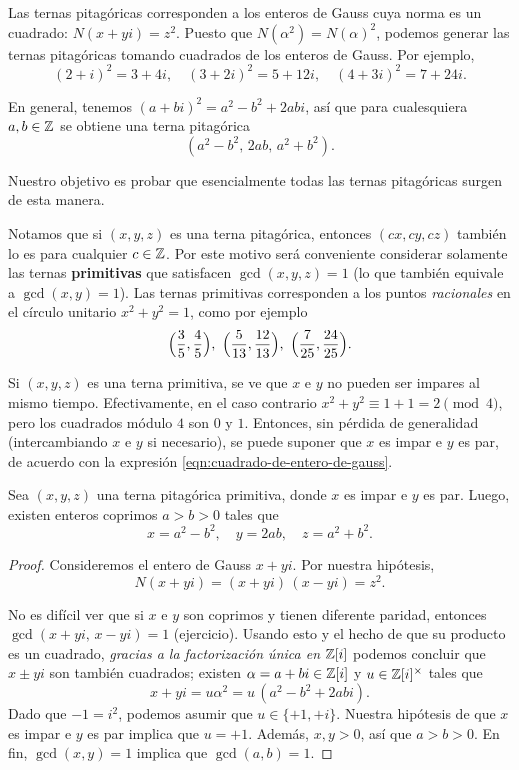 Las ternas pitagóricas corresponden a los enteros de Gauss cuya norma es un
cuadrado: $N (x+yi) = z^2$. Puesto que $N (\alpha^2) = N (\alpha)^2$, podemos
generar las ternas pitagóricas tomando cuadrados de los enteros de Gauss.
Por ejemplo,
\[ (2 + i)^2 = 3 + 4i, \quad
   (3 + 2i)^2 = 5 + 12i, \quad
   (4 + 3i)^2 = 7 + 24i. \]

En general, tenemos $(a + bi)^2 = a^2 - b^2 + 2ab i$, así que para cualesquiera
$a,b \in \mathbb{Z}$ se obtiene una terna pitagórica
\begin{equation}
  \label{eqn:cuadrado-de-entero-de-gauss}
  (a^2 - b^2, \, 2ab, \, a^2 + b^2).
\end{equation}

Nuestro objetivo es probar que esencialmente todas las ternas pitagóricas surgen
de esta manera.

Notamos que si $(x,y,z)$ es una terna pitagórica, entonces $(cx, cy, cz)$
también lo es para cualquier $c \in \mathbb{Z}$. Por este motivo será conveniente
considerar solamente las ternas \textbf{primitivas} que satisfacen
$\gcd (x,y,z) = 1$ (lo que también equivale a $\gcd (x,y) = 1$). Las ternas
primitivas corresponden a los puntos \emph{racionales} en el círculo unitario
$x^2 + y^2 = 1$, como por ejemplo
\[ \Bigl(\frac{3}{5}, \frac{4}{5}\Bigr), ~
   \Bigl(\frac{5}{13}, \frac{12}{13}\Bigr), ~
   \Bigl(\frac{7}{25}, \frac{24}{25}\Bigr). \]

Si $(x,y,z)$ es una terna primitiva, se ve que $x$ e $y$ no pueden ser impares
al mismo tiempo. Efectivamente, en el caso contrario $x^2 + y^2 \equiv 1 + 1 = 2
\pmod{4}$, pero los cuadrados módulo $4$ son $0$ y $1$. Entonces, sin pérdida de
generalidad (intercambiando $x$ e $y$ si necesario), se puede suponer que $x$ es
impar e $y$ es par, de acuerdo con la expresión
\eqref{eqn:cuadrado-de-entero-de-gauss}.

\begin{teorema}
  Sea $(x,y,z)$ una terna pitagórica primitiva, donde $x$ es impar e $y$ es
  par. Luego, existen enteros coprimos $a > b > 0$ tales que
  $$x = a^2 - b^2, \quad y = 2ab, \quad z = a^2 + b^2.$$

  \begin{proof}
    Consideremos el entero de Gauss $x + yi$. Por nuestra hipótesis,
    $$N (x + yi) = (x + yi)\,(x - yi) = z^2.$$

    No es difícil ver que si $x$ e $y$ son coprimos y tienen diferente paridad,
    entonces $\gcd (x + yi, \, x - yi) = 1$ (ejercicio). Usando esto y el hecho
    de que su producto es un cuadrado,
    \emph{gracias a la factorización única en $\mathbb{Z} [i]$} podemos concluir que
    $x \pm yi$ son también cuadrados; existen $\alpha = a + bi \in \mathbb{Z}[i]$ y
    $u \in \mathbb{Z}[i]^\times$ tales que
    $$x+yi = u\alpha^2 = u\,(a^2 - b^2 + 2ab i).$$
    Dado que $-1 = i^2$, podemos asumir que $u \in \{ +1, +i \}$. Nuestra
    hipótesis de que $x$ es impar e $y$ es par implica que $u = +1$. Además,
    $x,y > 0$, así que $a > b > 0$. En fin, $\gcd (x,y) = 1$ implica que
    $\gcd (a,b) = 1$.
  \end{proof}
\end{teorema}

